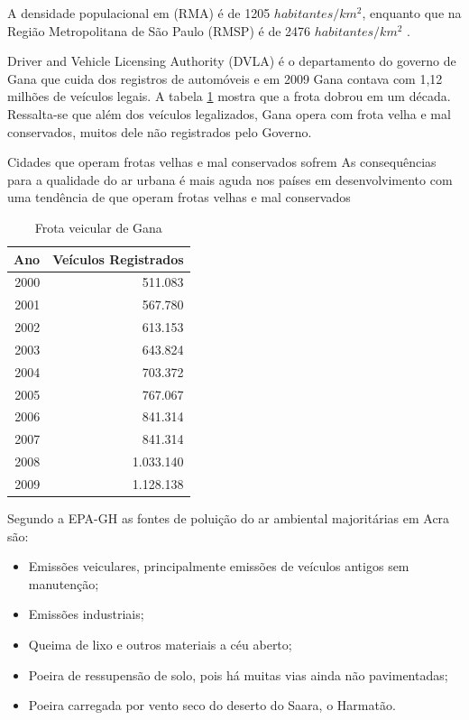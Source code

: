 A densidade populacional em (RMA) é de 1205 $habitantes/km^2$, 
enquanto que na Região Metropolitana de São Paulo (RMSP) é de 
2476 $habitantes/km^2$ \citep{ibge2011}. 

Driver and Vehicle Licensing Authority (DVLA) é o
departamento do governo de Gana que cuida dos registros de automóveis
e em 2009 Gana contava com 1,12 milhões de veículos legais. 
A tabela \ref{table:dvla} mostra que a frota dobrou em um década.
Ressalta-se que além dos veículos legalizados, Gana opera com frota velha e 
mal conservados, muitos dele não registrados pelo Governo. 

Cidades que operam frotas velhas e mal conservados sofrem 
As consequências para a qualidade do ar urbana é mais aguda nos países em desenvolvimento
com uma tendência de que operam frotas velhas e mal conservados

\begin{table}[H]
 \centering
  \begin{tabular}{rr}
  \hline
  Ano & Veículos Registrados \\ 
  \hline
  2000 & 511.083 \\ 
  2001 & 567.780 \\ 
  2002 & 613.153 \\ 
  2003 & 643.824 \\ 
  2004 & 703.372 \\ 
  2005 & 767.067 \\ 
  2006 & 841.314 \\ 
  2007 & 841.314 \\ 
  2008 & 1.033.140 \\ 
  2009 & 1.128.138 \\ 
  \hline
  \end{tabular}
  \caption{Frota veicular de Gana \citep{dvla} \label{table:dvla}}
\end{table}

Segundo a EPA-GH \citep{epa2015} as fontes de poluição do ar ambiental 
majoritárias em Acra são:

\begin{itemize}
 \item Emissões veiculares, principalmente emissões de veículos antigos sem 
       manutenção;
 \item Emissões industriais;
 \item Queima de lixo e outros materiais a céu aberto;
 \item Poeira de ressupensão de solo, pois há muitas vias ainda não pavimentadas;
 \item Poeira carregada por vento seco do deserto do Saara, o Harmatão.
\end{itemize}

